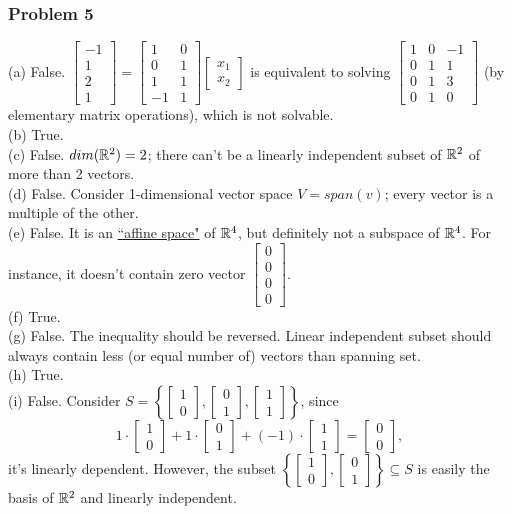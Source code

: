 \documentclass[12pt,a4paper]{article}
\renewcommand{\l}{\left}\renewcommand{\r}{\right}
\newcommand{\tv}[2]{\l[\begin{array}{c}{#1}\\{#2}\end{array}\r]}
\newcommand{\fv}[4]{\l[\begin{array}{c}{#1}\\{#2}\\{#3}\\{#4}\end{array}\r]}
\def\R{\ifmmode\mathbb R\fi}
\begin{document}
\subsubsection*{Problem 5}
(a) False. $\fv{-1}121 = \l[\begin{array}{cc}
1&0\\
0&1\\
1&1\\
-1&1
\end{array}\r]\tv {x_1}{x_2}$ is equivalent to solving $\l[\begin{array}{cc|c}
1&0&-1\\
0&1&1\\
0&1&3\\
0&1&0
\end{array}\r]$ (by elementary matrix operations), which is not solvable. \\
(b) True.\\
(c) False. $dim(\R^2) = 2$; there can't be a linearly independent subset of $\R^2$ of more than 2 vectors. \\
(d) False. Consider 1-dimensional vector space $V = span(v)$; every vector is a multiple of the other. \\
(e) False. It is an \href{https://en.wikipedia.org/wiki/Affine_space}{``affine space"} of $\R^4$, but definitely not a subspace of $\R^4$. For instance, it doesn't contain zero vector $\l[\begin{array}{c}0\\0\\0\\0\end{array}\r]$. \\
(f) True. \\
(g) False. The inequality should be reversed. Linear independent subset should always contain less (or equal number of) vectors than spanning set. \\
(h) True. \\
(i) False. Consider $S = \l\{\tv10, \tv01, \tv11\r\}$, since 
$$1\cdot \tv10 + 1 \cdot \tv01 + (-1)\cdot\tv11 = \tv00,$$
it's linearly dependent. However, the subset $\l\{\tv10, \tv01\r\}\subseteq S$ is easily the basis of $\R^2$ and linearly independent. 
\end{document}
